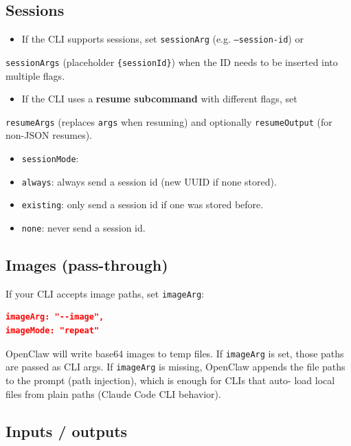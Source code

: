 \subsection{Sessions}


\begin{itemize}
  \item If the CLI supports sessions, set \texttt{sessionArg} (e.g. \texttt{--session-id}) or
\end{itemize}

\texttt{sessionArgs} (placeholder \texttt{\{sessionId\}}) when the ID needs to be inserted
into multiple flags.
\begin{itemize}
  \item If the CLI uses a \textbf{resume subcommand} with different flags, set
\end{itemize}

\texttt{resumeArgs} (replaces \texttt{args} when resuming) and optionally \texttt{resumeOutput}
(for non-JSON resumes).
\begin{itemize}
  \item \texttt{sessionMode}:
  \item \texttt{always}: always send a session id (new UUID if none stored).
  \item \texttt{existing}: only send a session id if one was stored before.
  \item \texttt{none}: never send a session id.
\end{itemize}


\subsection{Images (pass-through)}


If your CLI accepts image paths, set \texttt{imageArg}:

\begin{lstlisting}[language=json]
imageArg: "--image",
imageMode: "repeat"
\end{lstlisting}


OpenClaw will write base64 images to temp files. If \texttt{imageArg} is set, those
paths are passed as CLI args. If \texttt{imageArg} is missing, OpenClaw appends the
file paths to the prompt (path injection), which is enough for CLIs that auto-
load local files from plain paths (Claude Code CLI behavior).

\subsection{Inputs / outputs}



